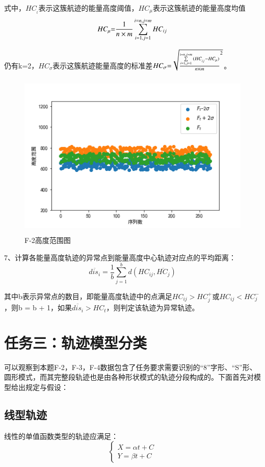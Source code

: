 \documentclass[GBK]{ctexart}
\begin{document}
\begin{spacing}{1.5}
式中，$H{C_{_t}}$表示这簇航迹的能量高度阈值，$H{C_\mu }$表示这簇航迹的能量高度均值
\begin{equation}
H{C_\mu }{\rm{ = }}\frac{1}{{n \times m}}\sum\limits_{i = 1,j = 1}^{i = n,j = m} {H{C_{ij}}}
\end{equation}

仍有k=2，$H{C_\sigma }$表示这簇航迹能量高度的标准差$H{C_\sigma }{\rm{ = }}\sqrt {{{\frac{{\sum\limits_{i = 1,j = 1}^{{\rm{i}} = n,j = m} {(H{C_{_{ij}}} - H{C_\mu })} }}{{n \times m}}}^2}} $。
\begin{figure}[H]
  \centering
  \includegraphics[width=15cm,height=8cm]{fanwei}
  \caption{F-2高度范围图}\label{fanwei}
\end{figure}
7、计算各能量高度轨迹的异常点到能量高度中心轨迹对应点的平均距离：
\begin{equation}
\overline {di{s_i}}  = \frac{1}{b}\sum\limits_{j = 1}^b {d(H{C_{ij}},\overline {H{C_j}} )}
\end{equation}

其中b表示异常点的数目，即能量高度轨迹中的点满足$H{C_{ij}} > HC_j^ +  $或$H{C_{ij}} < HC_j^ - $，则b = b + 1，如果$\overline {di{s_i}}  > H{C_t}$，则判定该轨迹为异常轨迹。

\section{任务三：轨迹模型分类}
可以观察到本题F-2，F-3，F-4数据包含了任务要求需要识别的“8”字形、“S”形、圆形模式，而其完整段轨迹也是由各种形状模式的轨迹分段构成的。下面首先对模型给出规定与假设：
\subsection{线型轨迹}
线性的单值函数类型的轨迹应满足：
\begin{equation}
\left\{ \begin{array}{l}
X = \alpha t + C\\
Y = \beta t + C
\end{array} \right.
\end{equation}


\end{spacing}
\end{document}
